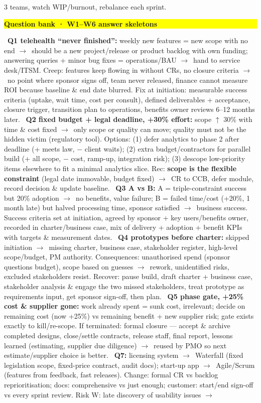 \documentclass[a4paper,landscape]{article}
\newcommand{\hlhighlight}[1]{\begingroup\setlength{\fboxsep}{0pt}\colorbox{yellow}{\strut\textbf{#1}}\endgroup}
\newcommand{\lbl}[1]{\textbf{#1}}
\newcommand{\kh}[1]{{\setlength{\fboxsep}{0.5pt}\colorbox{keyhlcolor}{#1}}}
\newcommand{\ra}{$\rightarrow$}
\begin{document}
\begin{multicols}{3}
teams, watch WIP/burnout, rebalance each sprint.\par

\par\smallskip\noindent\hlhighlight{Question bank · W1--W6 answer skeletons}\ \lbl{Q1 telehealth ``never finished'':} weekly new features = new scope with no end \ra\ should be a new project/release or product backlog with own funding; answering queries + minor bug fixes = \kh{operations/BAU} \ra\ hand to service desk/ITSM. Creep: features keep flowing in without CRs, no closure criteria \ra\ no point where sponsor signs off, team never released, finance cannot measure ROI because baseline \& end date blurred. Fix at initiation: measurable success criteria (uptake, wait time, cost per consult), defined deliverables + acceptance, closure trigger, transition plan to operations, benefits owner reviews 6--12 months later. \textbullet\ \lbl{Q2 fixed budget + legal deadline, +30\% effort:} scope $\uparrow$ 30\% with time \& cost fixed \ra\ only scope or quality can move; quality must not be the hidden victim (regulatory tool). Options: (1) \kh{defer analytics to phase 2} after deadline (+ meets law, $-$ client waits); (2) extra budget/contractors for parallel build (+ all scope, $-$ cost, ramp-up, integration risk); (3) descope low-priority items elsewhere to fit a minimal analytics slice. Rec: \lbl{scope is the flexible constraint} (legal date immovable, budget fixed) \ra\ CR to CCB, defer module, record decision \& update baseline. \textbullet\ \lbl{Q3 A vs B:} A = triple-constraint success but 20\% adoption \ra\ no benefits, value failure; B = failed time/cost (+20\%, 1 month late) but halved processing time, sponsor satisfied \ra\ business success. Success criteria set at initiation, agreed by \kh{sponsor + key users/benefits owner}, recorded in charter/business case, mix of delivery + adoption + benefit KPIs with targets \& measurement dates. \textbullet\ \lbl{Q4 prototypes before charter:} skipped \kh{initiation} \ra\ missing charter, business case, stakeholder register, high-level scope/budget, PM authority. Consequences: unauthorised spend (sponsor questions budget), scope based on guesses \ra\ rework, unidentified risks, excluded stakeholders resist. Recover: pause build, draft charter + business case, stakeholder analysis \& engage the two missed stakeholders, treat prototype as requirements input, get sponsor sign-off, then plan. \textbullet\ \lbl{Q5 phase gate, +25\% cost \& supplier gone:} work already spent = \kh{sunk cost}, irrelevant; decide on remaining cost (now +25\%) vs remaining benefit + new supplier risk; gate exists exactly to kill/re-scope. If terminated: formal closure --- accept \& archive completed designs, close/settle contracts, release staff, final report, lessons learned (estimating, supplier due diligence) \ra\ reused by PMO so next estimate/supplier choice is better. \textbullet\ \lbl{Q7:} licensing system \ra\ \kh{Waterfall} (fixed legislation scope, fixed-price contract, audit docs); start-up app \ra\ \kh{Agile/Scrum} (features from feedback, fast releases). Change: formal CR vs backlog reprioritisation; docs: comprehensive vs just enough; customer: start/end sign-off vs every sprint review. Risk W: late discovery of usability issues \ra\ 
\end{multicols}
\end{document}
